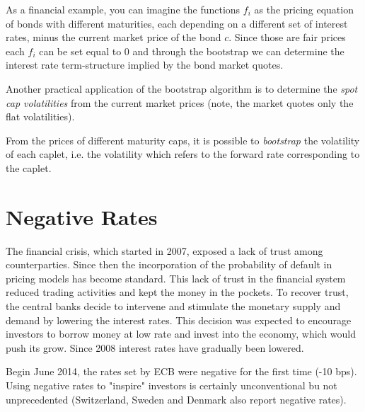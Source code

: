 \documentclass[12pt,a4paper]{book}
\begin{document}
As a financial example, you can imagine the functions $f_i$ as the pricing equation of bonds with different maturities, each depending on a different set of interest rates, minus the current market price of the bond $c$. Since those are fair prices each $f_i$ can be set equal to 0 and through the bootstrap we can determine the interest rate term-structure implied by the bond market quotes. 

Another practical application of the bootstrap algorithm is to determine the \emph{spot cap volatilities} from the current market prices (note, the market quotes only the flat volatilities).

From the prices of different maturity caps, it is possible to \emph{bootstrap} the volatility of each caplet, i.e. the volatility which refers to the forward rate corresponding to the caplet.

\section{Negative Rates}

The financial crisis, which started in 2007, exposed a lack of trust among counterparties. Since then the incorporation of the probability of default in pricing models has become standard.
This lack of trust in the financial system reduced trading activities and kept the money in the pockets.
To recover trust, the central banks decide to intervene and stimulate the monetary supply and demand by lowering the interest rates.
This decision was expected to encourage investors to borrow money at low rate and invest into the economy, which would push its grow. Since 2008 interest rates have gradually been lowered.

Begin June 2014, the rates set by ECB were negative for the first time (-10 bps). Using negative rates to "inspire" investors is certainly unconventional bu not unprecedented (Switzerland, Sweden and Denmark also report negative rates).
\end{document}
